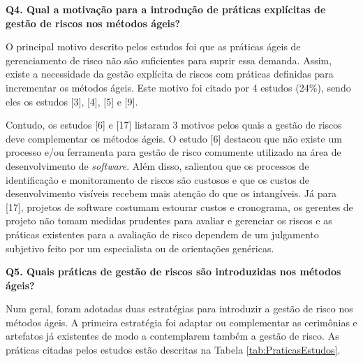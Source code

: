 \documentclass[
    12pt,       %
    openright,      %
    twoside,      %
    a4paper,      %
    english,      %
    french,       %
    spanish,      %
    brazil,       %
    ]{abntex2}
\begin{document}
\textbf{Q4. Qual a motivação para a introdução de práticas explícitas de gestão de riscos nos métodos ágeis?}

O principal motivo descrito pelos estudos foi que as práticas ágeis de gerenciamento de risco não são suficientes para suprir essa demanda. Assim, existe a necessidade da gestão explícita de riscos com práticas definidas para incrementar os métodos ágeis. Este motivo foi citado por 4 estudos (24\%), sendo eles os estudos [3], [4], [5] e [9].

Contudo, os estudos [6] e [17] listaram 3 motivos pelos quais a gestão de riscos deve complementar os métodos ágeis. O estudo [6] destacou que não existe um processo e/ou ferramenta para gestão de risco comumente utilizado na área de desenvolvimento de \textit{software}. Além disso, salientou que os processos de identificação e monitoramento de riscos são custosos e que os custos de desenvolvimento visíveis recebem mais atenção do que os intangíveis. Já para [17], projetos de software costumam estourar custos e cronograma, os gerentes de projeto não tomam medidas prudentes para avaliar e gerenciar os riscos e as práticas existentes para a avaliação de risco dependem de um julgamento subjetivo feito por um especialista ou de orientações genéricas.

\textbf{Q5. Quais práticas de gestão de riscos são introduzidas nos métodos ágeis?}

Num geral, foram adotadas duas estratégias para introduzir a gestão de risco nos métodos ágeis. A primeira estratégia foi adaptar ou complementar as cerimônias e artefatos já existentes de modo a contemplarem também a gestão de risco. As práticas citadas pelos estudos estão descritas na Tabela \ref{tab:PraticasEstudos}.
\end{document}
